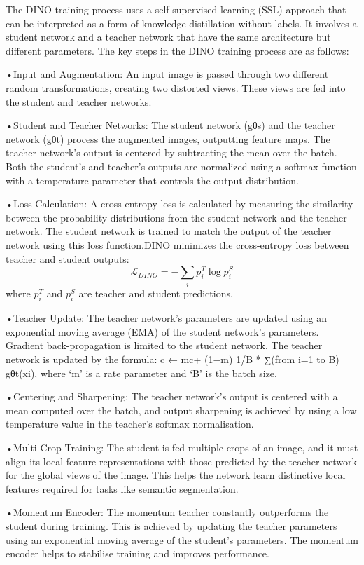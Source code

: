 \documentclass[
]{book}
\begin{document}
The DINO training process uses a self-supervised learning (SSL) approach that can be interpreted as a form of knowledge distillation without labels. It involves a student network and a teacher network that have the same architecture but different parameters. The key steps in the DINO training process are as follows:

•Input and Augmentation: An input image is passed through two different random transformations, creating two distorted views. These views are fed into the student and teacher networks.

•Student and Teacher Networks: The student network (gθs) and the teacher network (gθt) process the augmented images, outputting feature maps. The teacher network's output is centered by subtracting the mean over the batch. Both the student's and teacher's outputs are normalized using a softmax function with a temperature parameter that controls the output distribution.

•Loss Calculation: A cross-entropy loss is calculated by measuring the similarity between the probability distributions from the student network and the teacher network. The student network is trained to match the output of the teacher network using this loss function.DINO minimizes the cross-entropy loss between teacher and student
outputs: \[\mathcal{L}_{DINO} = - \sum_{i} p_i^T \log p_i^S\] where
\(p_i^T\) and \(p_i^S\) are teacher and student predictions.

•Teacher Update: The teacher network's parameters are updated using an exponential moving average (EMA) of the student network's parameters. Gradient back-propagation is limited to the student network. The teacher network is updated by the formula: c ← mc+ (1−m) 1/B * ∑(from i=1 to B) gθt(xi), where `m' is a rate parameter and `B' is the batch size.

•Centering and Sharpening: The teacher network's output is centered with a mean computed over the batch, and output sharpening is achieved by using a low temperature value in the teacher's softmax normalisation.

•Multi-Crop Training: The student is fed multiple crops of an image, and it must align its local feature representations with those predicted by the teacher network for the global views of the image. This helps the network learn distinctive local features required for tasks like semantic segmentation.

•Momentum Encoder: The momentum teacher constantly outperforms the student during training. This is achieved by updating the teacher parameters using an exponential moving average of the student's parameters. The momentum encoder helps to stabilise training and improves performance.
\end{document}
